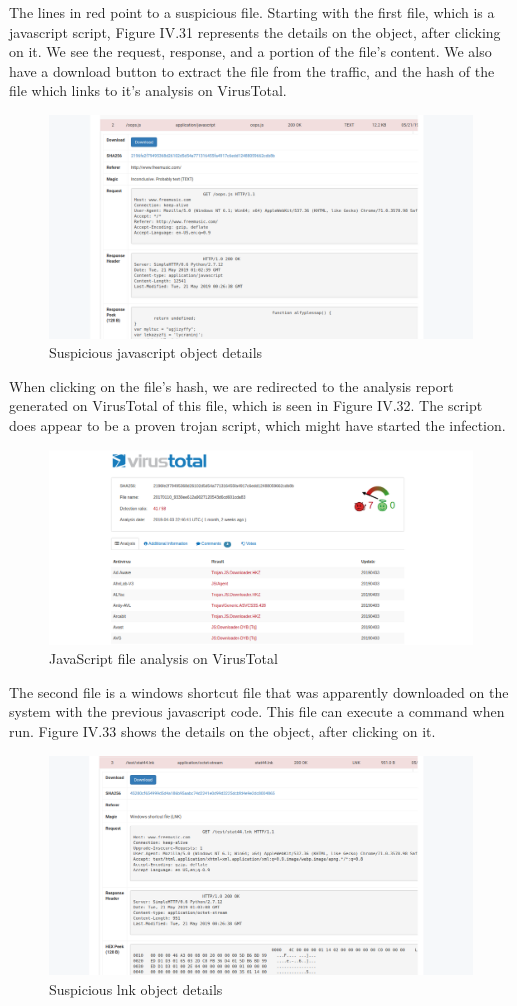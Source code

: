 The lines in red point to a suspicious file. Starting with the first file, which is a javascript script, Figure IV.31 represents the details on the object, after clicking on it. We see the request, response, and a portion of the file's content. We also have a download button to extract the file from the traffic, and the hash of the file which links to it's analysis on VirusTotal.
\begin{figure}[H]
\centering
\includegraphics[width=0.9\columnwidth]{Figures/31.png}
\caption{Suspicious javascript object details}
\end{figure}
When clicking on the file's hash, we are redirected to the analysis report generated on VirusTotal of this file, which is seen in Figure IV.32. The script does appear to be a proven trojan script, which might have started the infection.
\begin{figure}[H]
\centering
\includegraphics[width=0.9\columnwidth]{Figures/32.png}
\caption{JavaScript file analysis on VirusTotal}
\end{figure}
The second file is a windows shortcut file that was apparently downloaded on the system with the previous javascript code. This file can execute a command when run. Figure IV.33 shows the details on the object, after clicking on it.
\begin{figure}[H]
\centering
\includegraphics[width=0.9\columnwidth]{Figures/33.png}
\caption{Suspicious lnk object details}
\end{figure}
